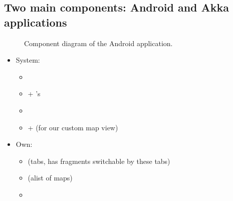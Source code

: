%
%
%
%
%

\subsection{Two main components: Android and Akka applications}
\label{subsec:component-android}


\begin{figure}[h]
	\centering
	\caption{Component diagram of the Android application.}
	\label{fig:diagram-components-android}
\end{figure}

\begin{itemize}
	\item {}System:
	\begin{itemize}
		\item {}
		\item {} + 's
		\item {}
		\item {} +  (for our custom map view)
	\end{itemize}

	\item Own:
	\begin{itemize}
		\item {} (tabs, has fragments switchable by these tabs)
		\item {} (alist of maps)
		\item {}
	\end{itemize}
\end{itemize}

